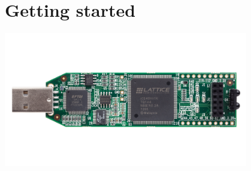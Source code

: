 \documentclass[10pt]{book}
\begin{document}
% 
% 
% 
% 


\endgroup

\thispagestyle{empty}
\pagestyle{headings}

\tableofcontents

\chapter{Getting started}

\begin{center}
\includegraphics[width=0.8\textwidth]{icestick-reva-front-2400.png}
\end{center}
\end{document}

